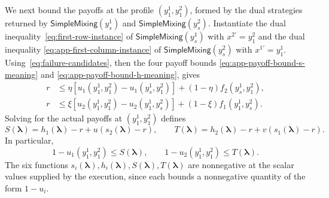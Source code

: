 \documentclass[11pt]{article}
\theoremstyle{remark}
\theoremstyle{plain}
\newcommand{\sm}{\mathsf{SimpleMixing}}
\begin{document}
We next bound the payoffs at the profile $(y_1^1,y_1^2)$, formed by
the dual strategies returned by $\sm(y_s^1)$ and $\sm(y_s^2)$.
Instantiate the dual inequality~\eqref{eq:first-row-instance}
of $\sm(y_s^1)$ with $x^{2\prime}=y_1^2$ and the dual inequality
\eqref{eq:app-first-column-instance} of $\sm(y_s^2)$ with
$x^{1\prime}=y_1^1$.
Using~\eqref{eq:failure-candidates}, then the four payoff bounds
\eqref{eq:app-payoff-bound-s-meaning} and
\eqref{eq:app-payoff-bound-h-meaning}, gives
\begin{equation}
 \begin{aligned}
 r&\le\eta[u_1(y_1^1,y_1^2)-u_1(y_s^1,y_1^2)]
                           +(1-\eta)f_2(y_s^1,y_1^2),\\
 r&\le\xi[u_2(y_1^1,y_1^2)-u_2(y_1^1,y_s^2)]
                           +(1-\xi)f_1(y_1^1,y_s^2).
 \end{aligned}
 \label{eq:app-first-round-cross-tests}
\end{equation}
Solving for the actual payoffs at $(y_1^1,y_1^2)$ defines
\begin{equation}
 S(\boldsymbol\lambda)=h_1(\boldsymbol\lambda)-r+u(s_2(\boldsymbol\lambda)-r),\qquad
 T(\boldsymbol\lambda)=h_2(\boldsymbol\lambda)-r+v(s_1(\boldsymbol\lambda)-r).
 \label{eq:payoff-bound-st}
\end{equation}
In particular,
\begin{equation}
 1-u_1(y_1^1,y_1^2)\le S(\boldsymbol\lambda),\qquad
 1-u_2(y_1^1,y_1^2)\le T(\boldsymbol\lambda).
 \label{eq:app-payoff-bound-st-meaning}
\end{equation}
The six functions $s_i(\boldsymbol\lambda),h_i(\boldsymbol\lambda),S(\boldsymbol\lambda),T(\boldsymbol\lambda)$ are nonnegative at the
scalar values supplied by the execution, since each bounds
a nonnegative quantity of the form $1-u_i$.
\end{document}
